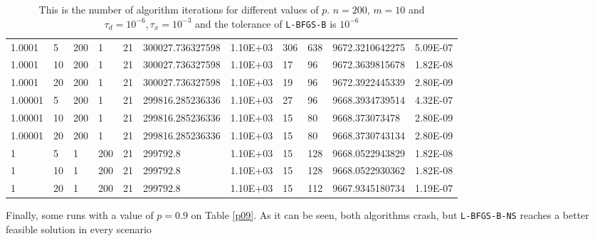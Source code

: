 \begin{table}
\begin{center}
\begin{tabular}{|l|l|l|l|l|l|l|l|l|l|l|}
      1.0001 & 5 & 200 &  1 & 21 & 300027.736327598 & 1.10E+03 & 306 & 638 & 9672.3210642275 & 5.09E-07\\
      1.0001 & 10 & 200 &  1 & 21 & 300027.736327598 & 1.10E+03 & 17 & 96 & 9672.3639815678 & 1.82E-08\\
      1.0001 & 20 & 200 &  1 & 21 & 300027.736327598 & 1.10E+03 & 19 & 96 & 9672.3922445339 & 2.80E-09\\
      1.00001 & 5 & 200 &  1 & 21 & 299816.285236336 & 1.10E+03 & 27 & 96 & 9668.3934739514 & 4.32E-07\\
      1.00001 & 10 & 200 &  1 & 21 & 299816.285236336 & 1.10E+03 & 15 & 80 & 9668.373073478 & 2.80E-09\\
      1.00001 & 20 & 200 &  1 & 21 & 299816.285236336 & 1.10E+03 & 15 & 80 & 9668.3730743134 & 2.80E-09\\
      1 & 5 & 1 & 200 &  21  & 299792.8 & 1.10E+03 & 15 & 128 & 9668.0522943829 & 1.82E-08\\
      1 & 10 & 1 & 200 &  21 & 299792.8 & 1.10E+03 & 15 & 128 & 9668.0522930362 & 1.82E-08\\
      1 & 20 & 1 & 200 &  21 & 299792.8 & 1.10E+03 & 15 & 112 & 9667.9345180734 & 1.19E-07\\
      \hline
    \end{tabular}
    \caption[Number of algorithm Iterations Changing $p$]{This is the number of algorithm iterations for different values of $p$. $n = 200$, $m = 10$ and $\tau_d = 10^{-6}, \tau_x = 10^{-3}$ and the tolerance of \texttt{L-BFGS-B} is $10^{-6}$ }
    \label{pmtable}
  \end{center}
\end{table}

Finally, some runs with a value of $p = 0.9$ on Table \ref{p09}. As it can be seen, both algorithms crash, but \texttt{L-BFGS-B-NS} reaches a better feasible solution in every scenario

